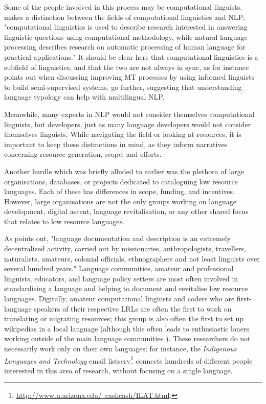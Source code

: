 Some of the people involved in this process may be computational linguists. \citet{bender2016linguistic} makes a distinction between the fields of computational linguistics and NLP: "computational linguistics is used to describe research interested in answering linguistic questions using computational methodology, while natural language processing describes research on automatic processing of human language for practical applications." It should be clear here that computational linguistics is a subfield of linguistics, and that the two are not always in sync, as for instance \citet{kay1997proper} points out when discussing improving MT processes by using informed linguists to build semi-supervised systems. \citet{bender2010grand, bender2016linguistic} go further, suggesting that understanding language typology can help with multilingual NLP.

Meanwhile, many experts in NLP would not consider themselves computational linguists, but developers, just as many language developers would not consider themselves linguists. While navigating the field or looking at resources, it is important to keep these distinctions in mind, as they inform narratives concerning resource generation, scope, and efforts.

Another hurdle which was briefly alluded to earlier was the plethora of large organisations, databases, or projects dedicated to cataloguing low resource languages. Each of these has differences in scope, funding, and incentives. However, large organisations are not the only groups working on language development, digital ascent, language revitalisation, or any other shared focus that relates to low resource languages.

As \citet{hammarstrom2015unesco} points out, "language documentation and description is an extremely decentralized activity, carried out by missionaries, anthropologists, travellers, naturalists, amateurs, colonial officials, ethnographers and not least linguists over several hundred years." Language communities, amateur and professional linguists, educators, and language policy setters are most often involved in standardising a language and helping to document and revitalise low resource languages. Digitally, amateur computational linguists and coders who are first-language speakers of their respective LRLs are often the first to work on translating or migrating resources; this group is also often the first to set up wikipedias in a local language (although this often leads to enthusiastic loners working outside of the main language communities \citep{soria2017digital}). These researchers do not necessarily work only on their own languages; for instance, the {\it Indigenous Languages and Technology} email listserv\footnote{\href{http://www.u.arizona.edu/~cashcash/ILAT.html}{http://www.u.arizona.edu/~cashcash/ILAT.html}. } connects hundreds of different people interested in this area of research, without focusing on a single language.

